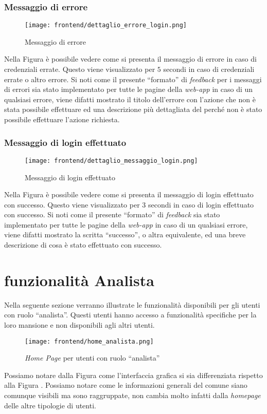         \subsubsection{Messaggio di errore}
        \begin{figure}[H]
            \centering
            \texttt{[image: frontend/dettaglio\_errore\_login.png]}
            \caption{Messaggio di errore}
            \label{fig:frontend-login-error}
        \end{figure}
        Nella Figura  è possibile vedere come si presenta il messaggio di errore in caso di credenziali errate. Questo viene visualizzato per $5$ secondi in caso di credenziali errate o altro errore.\newline
        Si noti come il presente ``formato'' di \textit{feedback} per i messaggi di errori sia stato implementato per tutte le pagine della \textit{web-app} in caso di un qualsiasi errore, viene difatti mostrato il titolo dell'errore con l'azione che non è stata possibile effettuare ed una descrizione più dettagliata del perché non è stato possibile effettuare l'azione richiesta.
        \subsubsection{Messaggio di login effettuato}
        \begin{figure}[H]
            \centering
            \texttt{[image: frontend/dettaglio\_messaggio\_login.png]}
            \caption{Messaggio di login effettuato}
            \label{fig:frontend-login-success}
        \end{figure}
        Nella Figura  è possibile vedere come si presenta il messaggio di login effettuato con successo. Questo viene visualizzato per $3$ secondi in caso di login effettuato con successo.\newline
        Si noti come il presente ``formato'' di \textit{feedback} sia stato implementato per tutte le pagine della \textit{web-app} in caso di un qualsiasi errore, viene difatti mostrato la scritta ``successo'', o altra equivalente, ed una breve descrizione di cosa è stato effettuato con successo.
\section{funzionalità Analista}
    Nella seguente sezione verranno illustrate le funzionalità disponibili per gli utenti con ruolo ``analista''. Questi utenti hanno accesso a funzionalità specifiche per la loro mansione e non disponibili agli altri utenti.
    \begin{figure}[H]
        \centering
        \texttt{[image: frontend/home\_analista.png]}
        \caption{\textit{Home Page} per utenti con ruolo ``analista''}
        \label{fig:frontend-analista}
    \end{figure}
    Possiamo notare dalla Figura  come l'interfaccia grafica si sia differenziata rispetto alla Figura . Possiamo notare come le informazioni generali del comune siano comunque visibili ma sono raggruppate, non cambia molto infatti dalla \textit{homepage} delle altre tipologie di utenti. 
